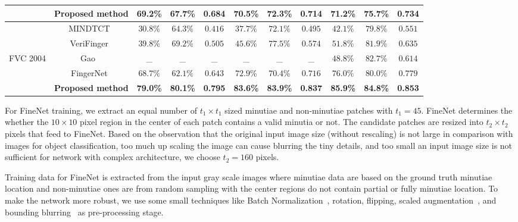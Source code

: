\documentclass[10pt,twocolumn,letterpaper]{article}
\begin{document}
\begin{table*}[!tbhp]
\begin{small}
\begin{adjustbox}{max width=\textwidth}
\begin{tabular}{|c|c|c|c|c|c|c|c|c|c|c|}
			\cline{2-11}{}&{\bfseries Proposed method}&{\bfseries 69.2\%}&{\bfseries 67.7\%}&{\bfseries 0.684}&{\bfseries 70.5\%}&{\bfseries 72.3\%}&{\bfseries 0.714}&{\bfseries 71.2\%}&{\bfseries 75.7\%}&{\bfseries 0.734}\\
			\hline{}&{MINDTCT~\cite{ko2007user}}&$30.8\%$&$64.3\%$&$0.416$&$37.7\%$&$72.1\%$&$0.495$&$42.1\%$&$79.8\%$&$0.551$\\{}&{VeriFinger~\cite{verifinger2010neuro}}&$39.8\%$&$69.2\%$&$0.505$&$45.6\%$&$77.5\%$&$0.574$&$51.8\%$&$81.9\%$&$0.635$\\{FVC 2004}&{Gao \etal~\cite{gao2010novel}}&\_ &\_ &\_ &\_ &\_ &\_ &$48.8\%$&$82.7\%$&$0.614$\\{}&{FingerNet~\cite{tang2017FingerNet}}&$68.7\%$&$62.1\%$&$0.643$&$72.9\%$&$70.4\%$&$0.716$&$76.0\%$&$80.0\%$&$0.779$\\
			\cline{2-11}{}&{\bfseries Proposed method}&{\bfseries 79.0\%}&{\bfseries 80.1\%}&{\bfseries 0.795}&{\bfseries 83.6\%}&{\bfseries 83.9\%}&{\bfseries 0.837}&{\bfseries 85.9\%}&{\bfseries 84.8\%}&{\bfseries 0.853}\\
			\hline
			
		\end{tabular}
		\end{adjustbox}
	\end{small}
\end{table*}

For FineNet training, we extract an equal number of $t_1 \times t_1$ sized minutiae and non-minutiae patches with $t_1 = 45$. FineNet determines the whether the $10 \times 10$ pixel region in the center of each patch contains a valid minutia or not. The candidate patches are resized into $t_2 \times t_2$ pixels that feed to FineNet. Based on the observation that the original input image size (without rescaling) is not large in comparison with images for object classification, too much up scaling the image can cause blurring the tiny details, and too small an input image size is not sufficient for network with complex architecture, we choose $t_2 = 160$ pixels.

Training data for FineNet is extracted from the input gray scale images where minutiae data are based on the ground truth minutiae location and non-minutiae ones are from random sampling with the center regions do not contain partial or fully minutiae location. To make the network more robust, we use some small techniques like Batch Normalization~\cite{ioffe2015batch}, rotation, flipping, scaled augmentation~\cite{simonyan2014very}, and bounding blurring~\cite{jiang2016direct} as pre-processing stage. 
\vspace{-2mm}
\end{document}
